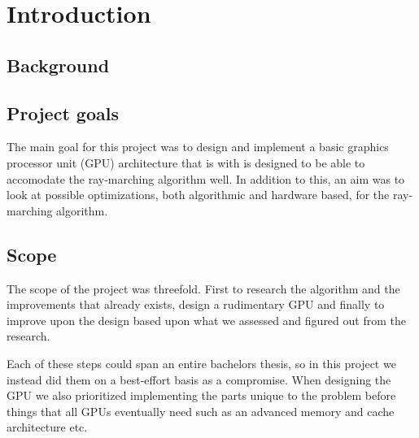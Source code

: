 \chapter{Introduction} 
	
	\section{Background}
	
	\section{Project goals}
		
		The main goal for this project was to design and implement a basic
		graphics processor unit (GPU) architecture that is with is designed to
		be able to accomodate the ray-marching algorithm well. In addition to
		this, an aim was to look at possible optimizations, both algorithmic
		and hardware based, for the ray-marching algorithm.
		
	\section{Scope}
		
		The scope of the project was threefold. First to research the algorithm
		and the improvements that already exists, design a rudimentary GPU and
		finally to improve upon the design based upon what we assessed and
		figured out from the research.

		Each of these steps could span an entire bachelors thesis, so in this
		project we instead did them on a best-effort basis as a compromise.
		When designing the GPU we also prioritized implementing the parts
		unique to the problem before things that all GPUs eventually need such
		as an advanced memory and cache architecture etc.

